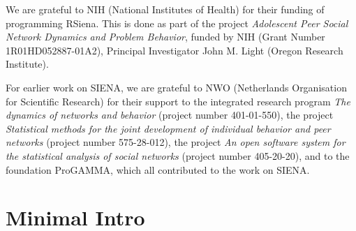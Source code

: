 \documentclass[a4paper,fleqn,11pt]{article}
\newcommand{\+}{\, + \,}
\newcommand{\rs}{{\sf RSiena}}
\newcommand{\si}{{\sf SIENA}}
\begin{document}

We are grateful to NIH (National Institutes of Health)
for their funding of programming \rs.
This is done
as part of the project \emph{Adolescent Peer Social Network Dynamics
and Problem Behavior}, funded by NIH (Grant Number 1R01HD052887-01A2),
Principal Investigator John M. Light (Oregon Research Institute).

For earlier work on \si, we are grateful to NWO (Netherlands Organisation for
Scientific Research) for their support to the integrated research program
\emph{The dynamics of networks and behavior} (project number 401-01-550),
the project \emph{Statistical methods for the joint development of
individual behavior and peer networks} (project number 575-28-012),
the project \emph{An open software system for the statistical
analysis of social networks} (project number 405-20-20),
and to the foundation ProGAMMA,
which all contributed to the work on \si.

\newpage
\part{Minimal Intro}
\end{document}
